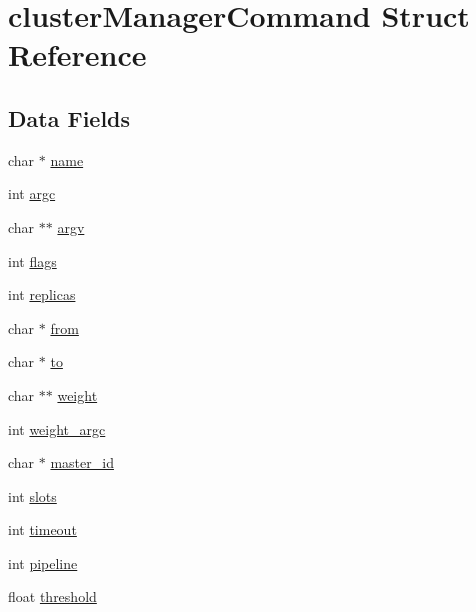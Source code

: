\hypertarget{structcluster_manager_command}{}\section{cluster\+Manager\+Command Struct Reference}
\label{structcluster_manager_command}
\subsection*{Data Fields}
\begin{DoxyCompactItemize}
\item 
char $\ast$ \hyperlink{structcluster_manager_command_a5ac083a645d964373f022d03df4849c8}{name}
\item 
int \hyperlink{structcluster_manager_command_ad1447518f4372828b8435ae82e48499e}{argc}
\item 
char $\ast$$\ast$ \hyperlink{structcluster_manager_command_af2efa898e9eed6fe6715279cb1ec35b0}{argv}
\item 
int \hyperlink{structcluster_manager_command_ac8bf36fe0577cba66bccda3a6f7e80a4}{flags}
\item 
int \hyperlink{structcluster_manager_command_a8ae018e1f77620e3b04d597737618b76}{replicas}
\item 
char $\ast$ \hyperlink{structcluster_manager_command_a765533dfc643627999c751f7e1514664}{from}
\item 
char $\ast$ \hyperlink{structcluster_manager_command_a5bafda9519252aa2d0fd038153f77dca}{to}
\item 
char $\ast$$\ast$ \hyperlink{structcluster_manager_command_ada3bc364c6e61924b60efc24e8a1d149}{weight}
\item 
int \hyperlink{structcluster_manager_command_ac8c8afcbde7c5bf8d79f5a121fe2601c}{weight\+\_\+argc}
\item 
char $\ast$ \hyperlink{structcluster_manager_command_a5156fe5a4a5df15461a4eb5c8c9238d9}{master\+\_\+id}
\item 
int \hyperlink{structcluster_manager_command_ac1e34a145d11fe4907398ed28bdca202}{slots}
\item 
int \hyperlink{structcluster_manager_command_a493b57f443cc38b3d3df9c1e584d9d82}{timeout}
\item 
int \hyperlink{structcluster_manager_command_a9fb2ad67672c7ea99eaa3fdf494b1b13}{pipeline}
\item 
float \hyperlink{structcluster_manager_command_a376acef8954eadc70f4b55e8e0588e13}{threshold}
\end{DoxyCompactItemize}


